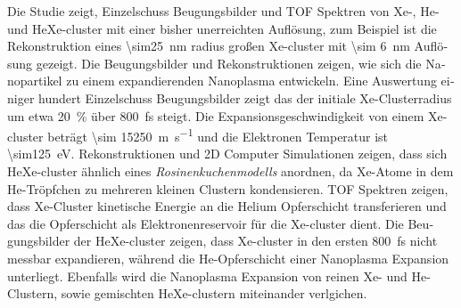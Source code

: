 \begin{otherlanguage}{german}
Die Studie zeigt, Einzelschuss Beugungsbilder und TOF Spektren von Xe-, He- und HeXe-cluster mit einer bisher unerreichten Auflösung, zum Beispiel ist die Rekonstruktion eines \SI{\sim25}{\nano\meter} radius großen Xe-cluster mit \SI{\sim 6}{\nano\meter} Auflösung gezeigt. Die Beugungsbilder und Rekonstruktionen zeigen, wie sich die Nanopartikel zu einem expandierenden Nanoplasma entwickeln. Eine Auswertung einiger hundert Einzelschuss Beugungsbilder zeigt das der initiale Xe-Clusterradius um etwa \SI{20}{\percent} über \SI{800}{\femto\second} steigt. Die Expansionsgeschwindigkeit von einem Xe-cluster beträgt \SI{\sim 15250}{\meter\per\second} und die Elektronen Temperatur ist \SI{\sim125}{\electronvolt}. Rekonstruktionen und 2D Computer Simulationen zeigen, dass sich HeXe-cluster ähnlich eines \textit{Rosinenkuchenmodells} anordnen, da Xe-Atome in dem He-Tröpfchen zu mehreren kleinen Clustern kondensieren. TOF Spektren zeigen, dass Xe-Cluster kinetische Energie an die Helium Opferschicht transferieren und das die Opferschicht als Elektronenreservoir für die Xe-cluster dient. Die Beugungsbilder der HeXe-cluster zeigen, dass Xe-cluster in den ersten \SI{800}{\femto\second} nicht messbar expandieren, während die He-Opferschicht einer Nanoplasma Expansion unterliegt. Ebenfalls wird die Nanoplasma Expansion von reinen Xe- und He-Clustern, sowie gemischten HeXe-clustern miteinander verlgichen.
\end{otherlanguage}